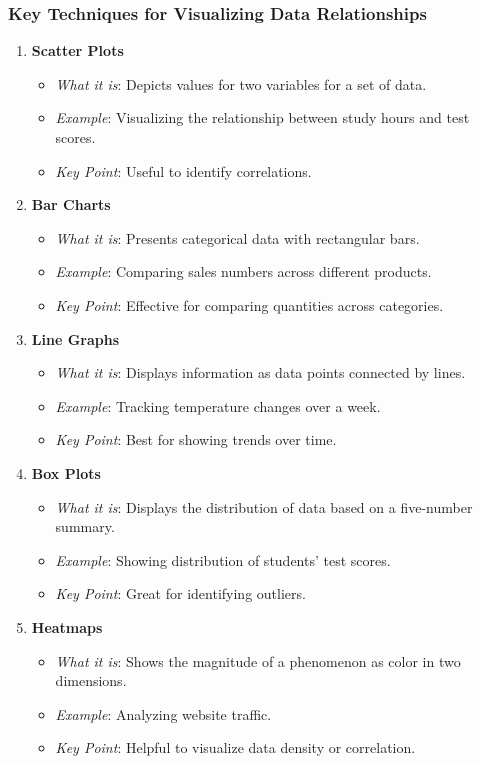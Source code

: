 \documentclass[aspectratio=169]{beamer}
\begin{document}
\begin{frame}[fragile]
    \frametitle{Key Techniques for Visualizing Data Relationships}
    \begin{enumerate}
        \item \textbf{Scatter Plots}
            \begin{itemize}
                \item \textit{What it is}: Depicts values for two variables for a set of data.
                \item \textit{Example}: Visualizing the relationship between study hours and test scores.
                \item \textit{Key Point}: Useful to identify correlations.
            \end{itemize}
        \item \textbf{Bar Charts}
            \begin{itemize}
                \item \textit{What it is}: Presents categorical data with rectangular bars.
                \item \textit{Example}: Comparing sales numbers across different products.
                \item \textit{Key Point}: Effective for comparing quantities across categories.
            \end{itemize}
        \item \textbf{Line Graphs}
            \begin{itemize}
                \item \textit{What it is}: Displays information as data points connected by lines.
                \item \textit{Example}: Tracking temperature changes over a week.
                \item \textit{Key Point}: Best for showing trends over time.
            \end{itemize}
        \item \textbf{Box Plots}
            \begin{itemize}
                \item \textit{What it is}: Displays the distribution of data based on a five-number summary.
                \item \textit{Example}: Showing distribution of students’ test scores.
                \item \textit{Key Point}: Great for identifying outliers.
            \end{itemize}
        \item \textbf{Heatmaps}
            \begin{itemize}
                \item \textit{What it is}: Shows the magnitude of a phenomenon as color in two dimensions.
                \item \textit{Example}: Analyzing website traffic.
                \item \textit{Key Point}: Helpful to visualize data density or correlation.
            \end{itemize}
    \end{enumerate}
\end{frame}
\end{document}
